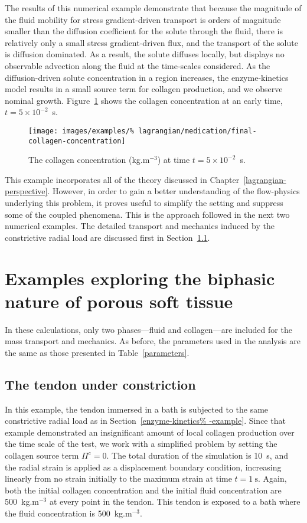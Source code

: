 The results of this numerical example demonstrate that because the
magnitude of the fluid mobility for stress gradient-driven transport
is orders of magnitude smaller than the diffusion coefficient for the
solute through the fluid, there is relatively only a small stress
gradient-driven flux, and the transport of the solute is diffusion
dominated. As a result, the solute diffuses locally, but displays no
observable advection along the fluid at the time-scales considered. As
the diffusion-driven solute concentration in a region increases, the
enzyme-kinetics model results in a small source term for collagen
production, and we observe nominal growth. Figure~\ref{eg3conc} shows
the collagen concentration at an early time, $t=5\times10^{-2}$~s.

\begin{figure}[!hpt]
  \centering
  \texttt{[image: images/examples/\%
    lagrangian/medication/final-collagen-concentration]}
  \caption{The collagen concentration (kg.m$^{-3}$) at time
    $t=5\times10^{-2}$~s.}
  \label{eg3conc}
\end{figure}

This example incorporates all of the theory discussed in
Chapter~\ref{lagrangian-perspective}. However, in order to gain a
better understanding of the flow-physics underlying this problem, it
proves useful to simplify the setting and suppress some of the coupled
phenomena. This is the approach followed in the next two numerical
examples. The detailed transport and mechanics induced by the
constrictive radial load are discussed first in
Section~\ref{constriction-1}.

\section{Examples exploring the biphasic nature of porous soft tissue}
\label{biphasic-examples-1}

In these calculations, only two phases---fluid and collagen---are
included for the mass transport and mechanics. As before, the
parameters used in the analysis are the same as those presented in
Table~\ref{parameters}.

\subsection{The tendon under constriction}
\label{constriction-1}

In this example, the tendon immersed in a bath is subjected to the
same constrictive radial load as in Section~\ref{enzyme-kinetics%
  -example}. Since that example demonstrated an insignificant amount
of local collagen production over the time scale of the test, we work
with a simplified problem by setting the collagen source term
$\Pi^\mathrm{c} = 0$. The total duration of the simulation is 10~s,
and the radial strain is applied as a displacement boundary condition,
increasing linearly from no strain initially to the maximum strain at
time $t = 1~\mathrm{s}$. Again, both the initial collagen
concentration and the initial fluid concentration are 500~kg.m$^{-3}$
at every point in the tendon. This tendon is exposed to a bath where
the fluid concentration is 500~kg.m$^{-3}$.

